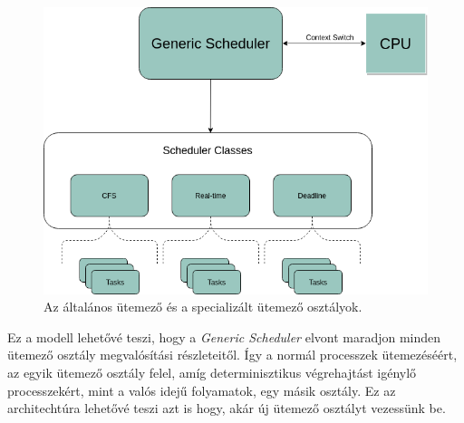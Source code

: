 \begin{figure}[h]
\centering
\includegraphics[width=\textwidth]{images/genericScheduler.png}
\caption{Az általános ütemező és a specializált ütemező osztályok.}
\label{fig:genericScheduler}
\end{figure}

Ez a modell lehetővé teszi, hogy a \textit{Generic Scheduler} elvont maradjon minden ütemező osztály megvalósítási részleteitől. Így a normál processzek ütemezéséért, az egyik ütemező osztály felel, amíg determinisztikus végrehajtást igénylő processzekért, mint a valós idejű folyamatok, egy másik osztály. Ez az architechtúra lehetővé teszi azt is hogy, akár új ütemező osztályt vezessünk be.

